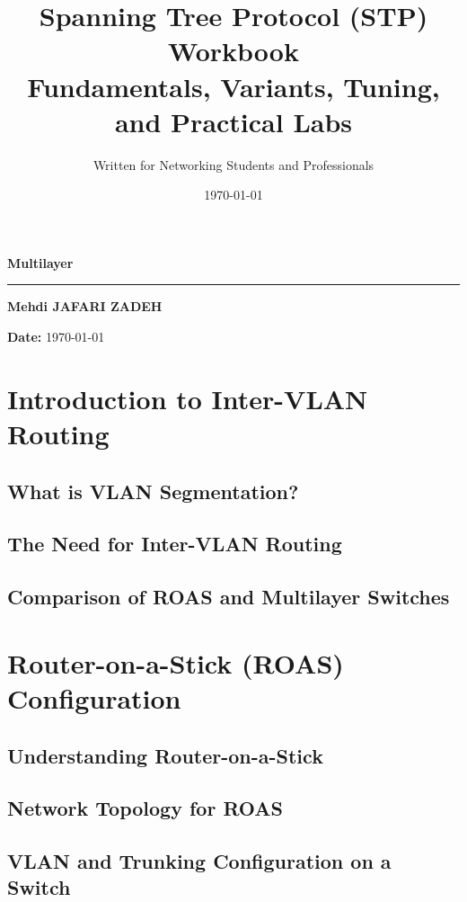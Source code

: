 \documentclass[a4paper]{report}
\title{\Huge \textbf{Spanning Tree Protocol (STP) Workbook}\\
       \Large Fundamentals, Variants, Tuning, and Practical Labs}
\author{\Large Written for Networking Students and Professionals}
\date{\today}
\begin{document}
\begin{titlepage}
    \centering
    \vspace*{4cm}
    {\Huge \textbf{Multilayer}\par}
    \vspace{0.8cm}
    {\Large }
    \vspace{0.3cm}
    \rule{0.9\textwidth}{1pt}
    
    \vspace{0.6cm}
    {\large \textbf{Mehdi JAFARI ZADEH}}\par
    \vspace{0.3cm}

    
    \vfill
    \textbf{Date:} \today
    \vspace{2cm}
\end{titlepage}

\tableofcontents
\newpage

\chapter{Introduction to Inter-VLAN Routing}
\section{What is VLAN Segmentation?}
\section{The Need for Inter-VLAN Routing}
\section{Comparison of ROAS and Multilayer Switches}

\chapter{Router-on-a-Stick (ROAS) Configuration}
\section{Understanding Router-on-a-Stick}
\section{Network Topology for ROAS}
\section{VLAN and Trunking Configuration on a Switch}
\end{document}
